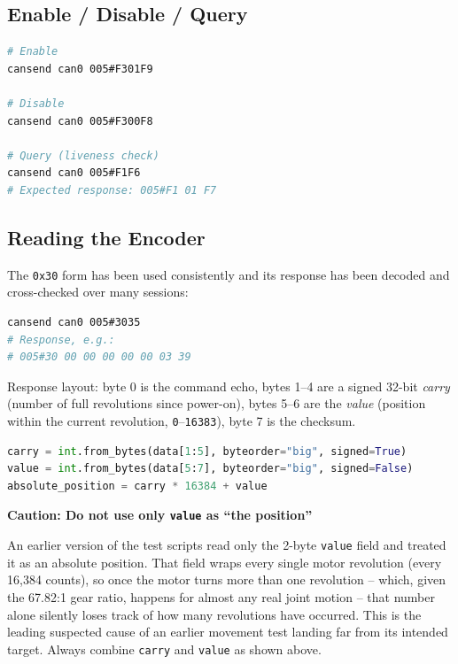 \documentclass[11pt,letterpaper]{article}
\newenvironment{caution}[1]{%
    \par\addvspace{8pt}%
    \noindent{\color{cautionred}\rule{\linewidth}{0.8pt}}\par\vspace{2pt}
    \noindent\textbf{\color{cautionred}Caution: #1}\par\vspace{2pt}
}{%
    \par\vspace{2pt}\noindent{\color{cautionred}\rule{\linewidth}{0.4pt}}%
    \par\addvspace{8pt}%
}
\begin{document}
\subsection{Enable / Disable / Query}

\begin{lstlisting}[language=bash, caption={Enable, disable, and query -- all checksum-verified}]
# Enable
cansend can0 005#F301F9

# Disable
cansend can0 005#F300F8

# Query (liveness check)
cansend can0 005#F1F6
# Expected response: 005#F1 01 F7
\end{lstlisting}

\subsection{Reading the Encoder}
\label{sec:encoder}

The \texttt{0x30} form has been used consistently and its response has been decoded and cross-checked over many sessions:

\begin{lstlisting}[language=bash]
cansend can0 005#3035
# Response, e.g.:
# 005#30 00 00 00 00 00 03 39
\end{lstlisting}

Response layout: byte 0 is the command echo, bytes 1--4 are a signed 32-bit \emph{carry} (number of full revolutions since power-on), bytes 5--6 are the \emph{value} (position within the current revolution, \texttt{0}--\texttt{16383}), byte 7 is the checksum.

\begin{lstlisting}[language=python, caption=Correct absolute-position extraction]
carry = int.from_bytes(data[1:5], byteorder="big", signed=True)
value = int.from_bytes(data[5:7], byteorder="big", signed=False)
absolute_position = carry * 16384 + value
\end{lstlisting}

\begin{caution}{Do not use only \texttt{value} as ``the position''}
An earlier version of the test scripts read only the 2-byte \texttt{value} field and treated it as an absolute position. That field wraps every single motor revolution (every 16{,}384 counts), so once the motor turns more than one revolution -- which, given the 67.82:1 gear ratio, happens for almost any real joint motion -- that number alone silently loses track of how many revolutions have occurred. This is the leading suspected cause of an earlier movement test landing far from its intended target. Always combine \texttt{carry} and \texttt{value} as shown above.
\end{caution}
\end{document}
